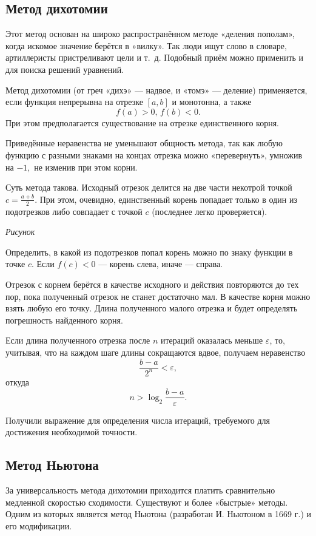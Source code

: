 \subsection{Метод дихотомии}

Этот метод основан на широко распространённом методе «деления пополам»,
когда искомое значение берётся в »вилку». Так люди ищут слово в словаре,
артиллеристы пристреливают цели и т.~д. Подобный приём можно применить
и для поиска решений уравнений.

Метод дихотомии (от греч «дихэ» — надвое, и «томэ» — деление) применяется,
если функция непрерывна на отрезке $[a,b]$ и монотонна, а также 
\[
f(a)>0,\, f(b)<0.
\]
При этом предполагается существование на отрезке единственного корня.

Приведённые неравенства не уменьшают общность метода, так как любую
функцию с разными знаками на концах отрезка можно «перевернуть», умножив
на $-1,$ не изменив при этом корни.

Суть метода такова. Исходный отрезок делится на две части некотрой
точкой $c=\frac{a+b}{2}$. При этом, очевидно, единственный корень
попадает только в один из подотрезков либо совпадает с точкой $c$
(последнее легко проверяется).

\emph{Рисунок}

Определить, в какой из подотрезков попал корень можно по знаку функции
в точке $c$. Если $f(c)<0$ — корень слева, иначе — справа.

Отрезок с корнем берётся в качестве исходного и действия повторяются
до тех пор, пока полученный отрезок не станет достаточно мал. В качестве
корня можно взять любую его точку. Длина полученного малого отрезка
и будет определять погрешность найденного корня.

Если длина полученного отрезка после $n$ итераций оказалась меньше
$\varepsilon$, то, учитывая, что на каждом шаге длины сокращаются
вдвое, получаем неравенство
\[
\frac{b-a}{2^{n}}<\varepsilon,
\]
откуда
\[
n>\log_{2}\frac{b-a}{\varepsilon}.
\]


Получили выражение для определения числа итераций, требуемого для
достижения необходимой точности.


\subsection{Метод Ньютона}

За универсальность метода дихотомии приходится платить сравнительно
медленной скоростью сходимости. Существуют и более «быстрые» методы.
Одним из которых является метод Ньютона (разработан И. Ньютоном в
1669 г.) и его модификации.

